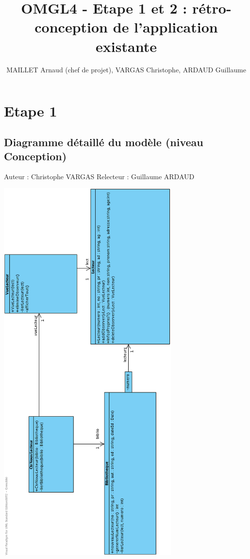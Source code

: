\documentclass[a4paper,10pt]{report}
\title{OMGL4 - Etape 1 et 2 : rétro-conception de l'application existante}
\author{MAILLET Arnaud (chef de projet), VARGAS Christophe, ARDAUD Guillaume}
\begin{document}
\maketitle
\newpage
\null
\newpage
\tableofcontents
\newpage
\null
\newpage

\centering

\chapter*{Etape 1}
\section*{Diagramme détaillé du modèle (niveau Conception)}

Auteur : Christophe VARGAS
Relecteur : Guillaume ARDAUD

\bigskip
\includegraphics[height=200mm]{etape1.png}
\end{document}
